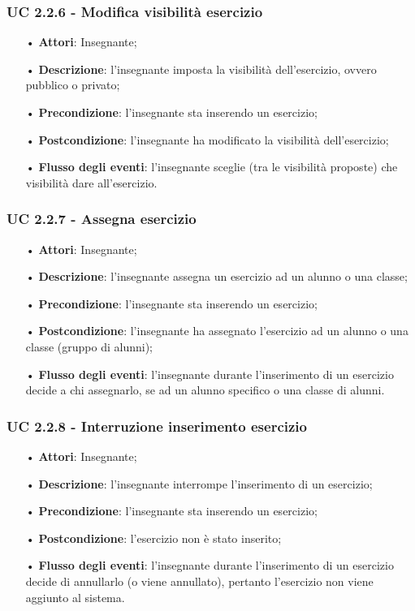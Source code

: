 \subsubsection{UC 2.2.6 - Modifica visibilità esercizio}
\begin{itemize}
	\item[•] \textbf{Attori}: Insegnante;
	\item[•] \textbf{Descrizione}: l'insegnante imposta la visibilità dell'esercizio, ovvero pubblico o privato;
	\item[•] \textbf{Precondizione}: l'insegnante sta inserendo un esercizio;
	\item[•] \textbf{Postcondizione}: l'insegnante ha modificato la visibilità dell'esercizio;
	\item[•] \textbf{Flusso degli eventi}: l'insegnante sceglie (tra le visibilità proposte) che visibilità dare all'esercizio.
\end{itemize}


\subsubsection{UC 2.2.7 - Assegna esercizio} 
\begin{itemize}
	\item[•] \textbf{Attori}: Insegnante;
	\item[•] \textbf{Descrizione}: l'insegnante assegna un esercizio ad un alunno o una classe;
	\item[•] \textbf{Precondizione}: l'insegnante sta inserendo un esercizio;
	\item[•] \textbf{Postcondizione}: l'insegnante ha assegnato l'esercizio ad un alunno o una classe (gruppo di alunni);
	\item[•] \textbf{Flusso degli eventi}: l'insegnante durante l'inserimento di un esercizio decide a chi assegnarlo, se ad un alunno specifico o una classe di alunni.
\end{itemize}

\subsubsection{UC 2.2.8 - Interruzione inserimento esercizio}
\begin{itemize}
	\item[•] \textbf{Attori}: Insegnante;
	\item[•] \textbf{Descrizione}: l'insegnante interrompe l'inserimento di un esercizio;
	\item[•] \textbf{Precondizione}: l'insegnante sta inserendo un esercizio;
	\item[•] \textbf{Postcondizione}: l'esercizio non è stato inserito;
	\item[•] \textbf{Flusso degli eventi}: l'insegnante durante l'inserimento di un esercizio decide di annullarlo (o viene annullato), pertanto l'esercizio non viene aggiunto al sistema.
\end{itemize}

